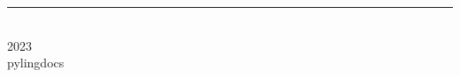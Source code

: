 \begin{titlingpage}
\BgThispage
{}
\vspace*{2cm}
\centering
\textcolor{white}{  }
\vspace*{3cm}\par
\noindent
{
\raggedleft
\begin{minipage}{0.90\linewidth}
\end{minipage} \hspace{15pt}
}
\centering
\vfill
\rule{0.4\textwidth}{0.4pt}\\
{\Huge 2023 \\ \large pylingdocs }
\end{titlingpage}
